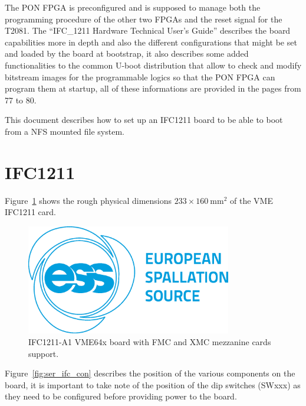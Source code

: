 \documentclass[11pt
  , a4paper
  , article
  , oneside
  , showtrims
]{memoir}
\begin{document}
The PON FPGA is preconfigured and is supposed to manage both the programming procedure of the other two FPGAs and the reset signal for the T2081.
The ``IFC\_1211 Hardware Technical User's Guide''\cite{IFC1211_HW_TUG} describes the board capabilities more in depth and also the different configurations that might be set and loaded by the board at bootstrap, it also describes some added functionalities to the common U-boot distribution that allow to check and modify bitstream images for the programmable logics so that the PON FPGA can program them at startup, all of these informations are provided in the pages from 77 to 80.

This document describes how to set up an IFC1211 board to be able to boot from a NFS mounted file system.

\section{IFC1211}
Figure~\ref{fig:ifc1211_dim} shows the rough physical dimensions $233\times 160~\mathrm{mm}{}^2$ of the VME IFC1211 card.

\begin{figure}[!htb]
  \centering
  \includegraphics[width=0.80\textwidth]{./figs/ESS_Logo_Frugal_Blue_cmyk.eps}
  \caption{
    IFC1211-A1 VME64x board with FMC and XMC mezzanine cards support.
  }
  \label{fig:ifc1211_dim}   
\end{figure}

Figure~\ref{fig:ser_ifc_con} describes the position of the various components on the board, it is important to take note of the position of the dip switches (SWxxx) as they need to be configured before providing power to the board.
\end{document}
